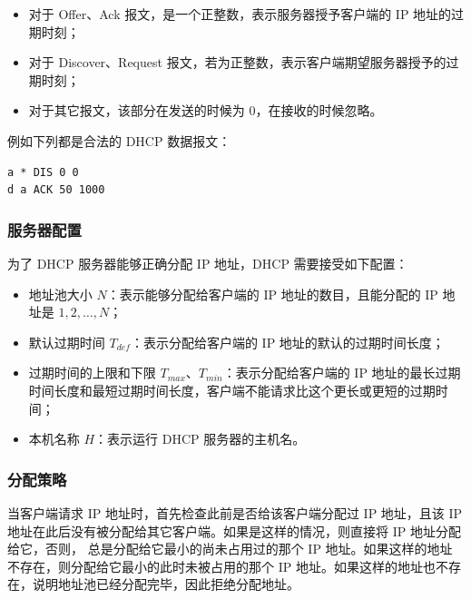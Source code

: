 \begin{itemize}
\begin{itemize}
\item 对于 Offer、Ack 报文，是一个正整数，表示服务器授予客户端的 IP 地址的过期时刻；

\item 对于 Discover、Request 报文，若为正整数，表示客户端期望服务器授予的过期时刻；

\item 对于其它报文，该部分在发送的时候为 0，在接收的时候忽略。

\end{itemize}



\end{itemize}

例如下列都是合法的 DHCP 数据报文：

\begin{lstlisting}
a * DIS 0 0
d a ACK 50 1000
\end{lstlisting}

\subsubsection*{服务器配置}

为了 DHCP 服务器能够正确分配 IP 地址，DHCP 需要接受如下配置：

\begin{itemize}

\item 地址池大小 $N$：表示能够分配给客户端的 IP 地址的数目，且能分配的 IP 地址是 $1, 2, \dots, N$；

\item 默认过期时间 $T_{def}$：表示分配给客户端的 IP 地址的默认的过期时间长度；

\item 过期时间的上限和下限 $T_{max}$、$T_{min}$：表示分配给客户端的 IP 地址的最长过期时间长度和最短过期时间长度，客户端不能请求比这个更长或更短的过期时间；

\item 本机名称 $H$：表示运行 DHCP 服务器的主机名。

\end{itemize}

\subsubsection*{分配策略}

当客户端请求 IP 地址时，首先检查此前是否给该客户端分配过 IP 地址，且该 IP 地址在此后没有被分配给其它客户端。如果是这样的情况，则直接将 IP 地址分配给它，否则，
总是分配给它最小的尚未占用过的那个 IP 地址。如果这样的地址不存在，则分配给它最小的此时未被占用的那个 IP 地址。如果这样的地址也不存在，说明地址池已经分配完毕，因此拒绝分配地址。

